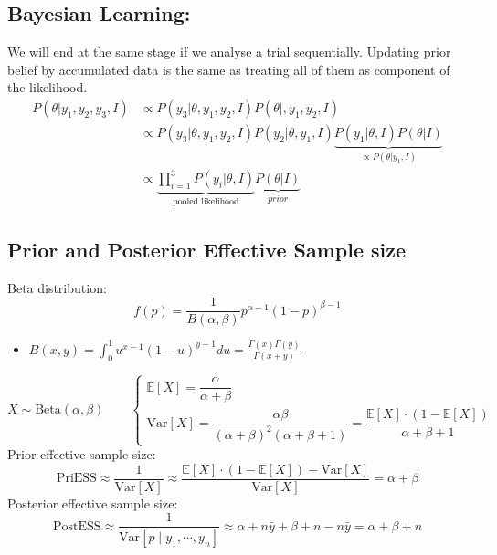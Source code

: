 \documentclass{article}\usepackage[]{graphicx}\usepackage[]{xcolor}
\begin{document}
\begin{multicols*}{2}
\subsection{Bayesian Learning:}
We will end at the same stage if we analyse a trial sequentially. Updating prior belief by accumulated data is the same as treating all of them as component of the likelihood.
\begin{align*}
P(\theta|y_1,y_2,y_3,I)&\propto P(y_3|\theta,y_1,y_2,I)P(\theta|,y_1,y_2,I)\\
&\propto P(y_3|\theta,y_1,y_2,I)P(y_2|\theta,y_1,I)\underbrace{P(y_1|\theta,I)P(\theta|I)}_{\propto P(\theta|y_1,I)}\\
&\propto \underbrace{\prod_{i=1}^{3}P(y_i|\theta,I)}_{\text{pooled likelihood}}\underbrace{P(\theta|I)}_{prior}
\end{align*}

\subsection{Prior and Posterior Effective Sample size}
Beta distribution:
\begin{equation*}
    f(p)=\frac{1}{B(\alpha,\beta)}p^{\alpha-1}(1-p)^{\beta-1}
\end{equation*}
\begin{itemize}
    \item $B(x,y)=\int_0^1u^{x-1}(1-u)^{y-1}du=\frac{\Gamma(x)\Gamma(y)}{\Gamma(x+y)}$
\end{itemize}
\begin{equation*}
    X\sim\text{Beta}(\alpha, \beta)\qquad
    \begin{cases}
    \mathbb{E}[X]=\dfrac{\alpha}{\alpha+\beta} \\
    \text{Var}[X]=\dfrac{\alpha\beta}{(\alpha+\beta)^2(\alpha+\beta+1)}=
    \dfrac{\mathbb{E}[X]\cdot(1-\mathbb{E}[X])}{\alpha+\beta+1}
    \end{cases}
\end{equation*}
Prior effective sample size:
\begin{equation*}
    \text{PriESS}\approx\frac{1}{\text{Var}[X]}\approx
    \frac{\mathbb{E}[X]\cdot (1-\mathbb{E}[X])-\text{Var}[X]}{\text{Var}[X]}=
    \alpha+\beta
\end{equation*}
Posterior effective sample size:
\begin{equation*}
    \text{PostESS}\approx\frac{1}{\text{Var}[p\mid y_1,\cdots,y_n]}\approx
    \alpha+n\bar{y}+\beta+n-n\bar{y}=\alpha+\beta+n
\end{equation*}


\end{multicols*}
\end{document}
